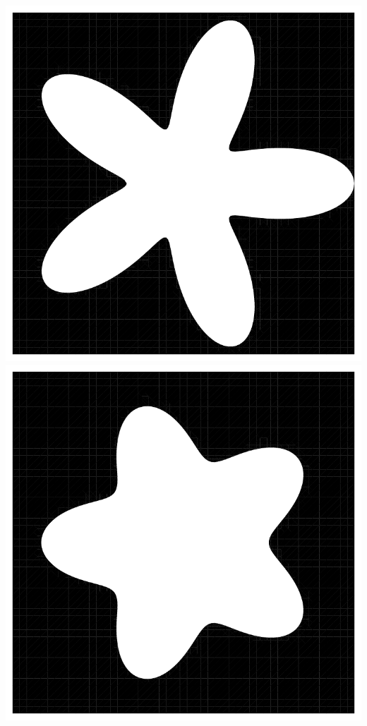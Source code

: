 \documentclass[12 pt]{article}
\begin{document}
\begin{center}
    \includegraphics[width=.3\paperwidth]{images/exampleOne.pdf}\hspace{10pt}\includegraphics[width=.3\paperwidth]{images/exampleHalf.pdf}
\end{center}
\end{document}
